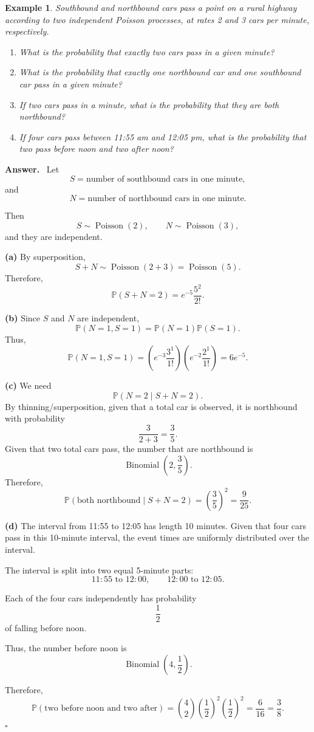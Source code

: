 \documentclass[12pt,a4paper]{article}
\theoremstyle{lecturestyle}
\newtheorem{example}{Example}
\newenvironment{answer}
{\par\textbf{Answer.}\ }
{\hfill$\square$\par}
\newcommand{\Prob}{\mathbb{P}}
\begin{document}
\begin{example}
Southbound and northbound cars pass a point on a rural highway according to two independent Poisson processes, at rates 2 and 3 cars per minute, respectively.

\begin{enumerate}[label=(\alph*)]
    \item What is the probability that exactly two cars pass in a given minute?
    \item What is the probability that exactly one northbound car and one southbound car pass in a given minute?
    \item If two cars pass in a minute, what is the probability that they are both northbound?
    \item If four cars pass between 11:55 am and 12:05 pm, what is the probability that two pass before noon and two after noon?
\end{enumerate}
\end{example}

\begin{answer}
Let
\[
S=\text{number of southbound cars in one minute},
\]
and
\[
N=\text{number of northbound cars in one minute}.
\]

Then
\[
S\sim \operatorname{Poisson}(2),
\qquad
N\sim \operatorname{Poisson}(3),
\]
and they are independent.

\textbf{(a)} By superposition,
\[
S+N\sim \operatorname{Poisson}(2+3)=\operatorname{Poisson}(5).
\]
Therefore,
\[
\Prob(S+N=2)=e^{-5}\frac{5^2}{2!}.
\]

\textbf{(b)} Since $S$ and $N$ are independent,
\[
\Prob(N=1,S=1)=\Prob(N=1)\Prob(S=1).
\]
Thus,
\[
\Prob(N=1,S=1)
=
\left(e^{-3}\frac{3^1}{1!}\right)
\left(e^{-2}\frac{2^1}{1!}\right)
=
6e^{-5}.
\]

\textbf{(c)} We need
\[
\Prob(N=2\mid S+N=2).
\]
By thinning/superposition, given that a total car is observed, it is northbound with probability
\[
\frac{3}{2+3}=\frac35.
\]
Given that two total cars pass, the number that are northbound is
\[
\operatorname{Binomial}\left(2,\frac35\right).
\]
Therefore,
\[
\Prob(\text{both northbound}\mid S+N=2)
=
\left(\frac35\right)^2
=
\frac9{25}.
\]

\textbf{(d)} The interval from 11:55 to 12:05 has length 10 minutes. Given that four cars pass in this 10-minute interval, the event times are uniformly distributed over the interval.

The interval is split into two equal 5-minute parts:
\[
11{:}55\text{ to }12{:}00,
\qquad
12{:}00\text{ to }12{:}05.
\]

Each of the four cars independently has probability
\[
\frac12
\]
of falling before noon.

Thus, the number before noon is
\[
\operatorname{Binomial}\left(4,\frac12\right).
\]

Therefore,
\[
\Prob(\text{two before noon and two after})
=
\binom42\left(\frac12\right)^2\left(\frac12\right)^2
=
\frac{6}{16}
=
\frac38.
\]
\end{answer}
\end{document}
